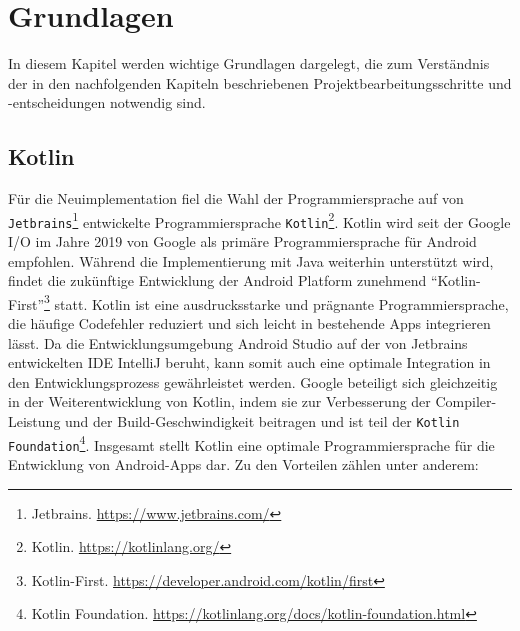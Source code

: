 \chapter{Grundlagen}\label{ch:grundlagen}

In diesem Kapitel werden wichtige Grundlagen dargelegt, die zum Verständnis der in den nachfolgenden Kapiteln beschriebenen Projektbearbeitungsschritte und -entscheidungen notwendig sind.

\section{Kotlin}

Für die Neuimplementation fiel die Wahl der Programmiersprache auf von \texttt{Jetbrains}\footnote{Jetbrains. \url{https://www.jetbrains.com/}} entwickelte Programmiersprache \texttt{Kotlin}\footnote{Kotlin. \url{https://kotlinlang.org/}}. Kotlin wird seit der Google I/O im Jahre 2019 von Google als primäre Programmiersprache für Android empfohlen. Während die Implementierung mit Java weiterhin unterstützt wird, findet die zukünftige Entwicklung der Android Platform zunehmend \enquote{Kotlin-First}\footnote{Kotlin-First. \url{https://developer.android.com/kotlin/first}} statt. Kotlin ist eine ausdrucksstarke und prägnante Programmiersprache, die häufige Codefehler reduziert und sich leicht in bestehende Apps integrieren lässt. Da die Entwicklungsumgebung Android Studio auf der von Jetbrains entwickelten IDE IntelliJ beruht, kann somit auch eine optimale Integration in den Entwicklungsprozess gewährleistet werden. Google beteiligt sich gleichzeitig in der Weiterentwicklung von Kotlin, indem sie zur Verbesserung der Compiler-Leistung und der Build-Geschwindigkeit beitragen und ist teil der \texttt{Kotlin Foundation}\footnote{Kotlin Foundation. \url{https://kotlinlang.org/docs/kotlin-foundation.html}}. Insgesamt stellt Kotlin eine optimale Programmiersprache für die Entwicklung von Android-Apps dar. Zu den Vorteilen zählen unter anderem:   

